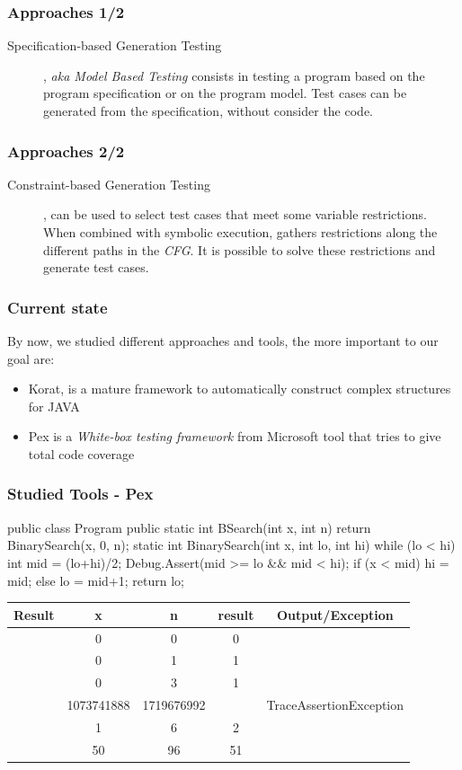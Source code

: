 \documentclass{beamer}
\newcommand{\checkK}{\color{green}\checkmark}
\newcommand{\cross}{\color{red}\hspace{-3pt}\ding{55}}
\begin{document}
\begin{frame}\frametitle{Approaches 1/2}
\begin{description}
\item[Specification-based Generation Testing], \textit{aka Model Based Testing} consists in testing a program based on the program specification or on the program model.
Test cases can be generated from the specification, without consider the code.
\end{description}
\end{frame}

\begin{frame}\frametitle{Approaches 2/2}
\begin{description}
\item[Constraint-based Generation Testing], can be used to select test cases that meet some variable restrictions.
When combined with symbolic execution, gathers restrictions along the different paths in the \textit{CFG}.
It is possible to solve these restrictions and generate test cases.
\end{description}
\end{frame}

\begin{frame}\frametitle{Current state}
By now, we studied different approaches and tools, the more important to our goal are:
\begin{itemize}
\item Korat, is a mature framework to automatically construct complex structures for JAVA
\item Pex is a \textit{White-box testing framework} from Microsoft tool that tries to give total code coverage
\end{itemize}
\end{frame}

\begin{frame}[fragile] \frametitle{Studied Tools - Pex}
\begin{code}
public class Program {
  public static int BSearch(int x, int n) {
    return BinarySearch(x, 0, n);
  }
  static int BinarySearch(int x, int lo, int hi) {
    while (lo < hi) {
      int mid = (lo+hi)/2;
      Debug.Assert(mid >= lo && mid < hi);
      if (x < mid) { hi = mid; } else { lo = mid+1; }
    }
    return lo;
  }
}
\end{code}

{\tiny \begin{tabular}{|c|c|c|c|c|}\hline
Result & x & n & result & Output/Exception \\\hline
\checkK & 0 & 0 & 0      & \\\hline
\checkK & 0 & 1 & 1      & \\\hline
\checkK & 0 & 3 & 1      & \\\hline
\cross & 1073741888 & 1719676992 & & TraceAssertionException \\\hline
\checkK & 1 & 6 & 2      & \\\hline
\checkK & 50 & 96 & 51      &\\\hline
\end{tabular}
}
\end{frame}
\end{document}
